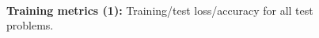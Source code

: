 \begin{figure}[p]
    \vspace{2mm}

    \textbf{\cifarten \threecthreed \adam}\\[2mm]
    \begin{minipage}[t]{0.50\textwidth}
        \centering
    \end{minipage}\hfill
    \begin{minipage}[t]{0.50\textwidth}
        \centering
    \end{minipage}

    \caption{\textbf{Training metrics (1):}
        Training/test loss/accuracy for all test problems.}
    \label{fig:training_metrics_1}
\end{figure}






